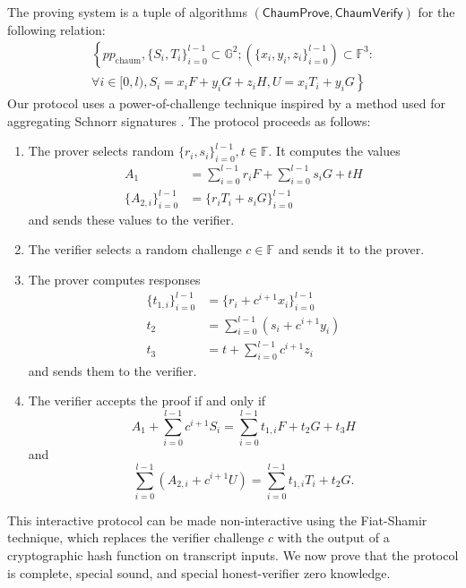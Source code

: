 \documentclass{llncs}
\newcommand{\G}{\mathbb{G}}
\newcommand{\F}{\mathbb{F}}
\newcommand{\func}[1]{\mathsf{#1}}
\begin{document}
The proving system is a tuple of algorithms $(\func{ChaumProve},\func{ChaumVerify})$ for the following relation:
\begin{multline*}
\left\{ pp_{\text{chaum}}, \{S_i, T_i\}_{i=0}^{l-1} \subset \G^2 ; (\{x_i, y_i, z_i\}_{i=0}^{l-1}) \subset \F^3 : \right. \\
\left. \forall i \in [0,l), S_i = x_i F + y_i G + z_i H, U = x_i T_i + y_i G \right\}
\end{multline*}
Our protocol uses a power-of-challenge technique inspired by a method used for aggregating Schnorr signatures \cite{batchschnorr}.
The protocol proceeds as follows:
\begin{enumerate}
    \item The prover selects random $\{r_i,s_i\}_{i=0}^{l-1}, t \in \F$.
    It computes the values
    \begin{align*}
        A_1 &= \sum_{i=0}^{l-1} r_i F + \sum_{i=0}^{l-1} s_i G + tH \\
        \{A_{2,i}\}_{i=0}^{l-1} &= \{r_i T_i + s_i G\}_{i=0}^{l-1}
    \end{align*}
    and sends these values to the verifier.
    \item The verifier selects a random challenge $c \in \F$ and sends it to the prover.
    \item The prover computes responses
    \begin{align*}
        \{t_{1,i}\}_{i=0}^{l-1} &= \{r_i + c^{i+1} x_i\}_{i=0}^{l-1} \\
        t_2 &= \sum_{i=0}^{l-1} (s_i + c^{i+1} y_i) \\
        t_3 &= t + \sum_{i=0}^{l-1} c^{i+1} z_i
    \end{align*}
    and sends them to the verifier.
    \item The verifier accepts the proof if and only if $$A_1 + \sum_{i=0}^{l-1} c^{i+1} S_i = \sum_{i=0}^{l-1} t_{1,i} F + t_2 G + t_3 H$$ and $$\sum_{i=0}^{l-1} (A_{2,i} + c^{i+1} U) = \sum_{i=0}^{l-1} t_{1,i} T_i + t_2 G.$$
\end{enumerate}

This interactive protocol can be made non-interactive using the Fiat-Shamir technique, which replaces the verifier challenge $c$ with the output of a cryptographic hash function on transcript inputs.
We now prove that the protocol is complete, special sound, and special honest-verifier zero knowledge.
\end{document}
